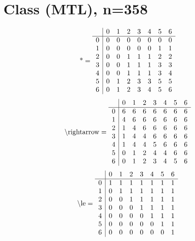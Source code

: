 \documentclass[11pt]{article}
\begin{document}
\section{Class (MTL), n=358}
\[\text{*} = 
\begin{array}{r | r r r r r r r}
 & 0 & 1 & 2 & 3 & 4 & 5 & 6 \\ \hline
0 & 0 & 0 & 0 & 0 & 0 & 0 & 0 \\
1 & 0 & 0 & 0 & 0 & 0 & 1 & 1 \\
2 & 0 & 0 & 1 & 1 & 1 & 2 & 2 \\
3 & 0 & 0 & 1 & 1 & 1 & 3 & 3 \\
4 & 0 & 0 & 1 & 1 & 1 & 3 & 4 \\
5 & 0 & 1 & 2 & 3 & 3 & 5 & 5 \\
6 & 0 & 1 & 2 & 3 & 4 & 5 & 6 \\
\end{array}
\]
\[\text{\textbackslash rightarrow} = 
\begin{array}{r | r r r r r r r}
 & 0 & 1 & 2 & 3 & 4 & 5 & 6 \\ \hline
0 & 6 & 6 & 6 & 6 & 6 & 6 & 6 \\
1 & 4 & 6 & 6 & 6 & 6 & 6 & 6 \\
2 & 1 & 4 & 6 & 6 & 6 & 6 & 6 \\
3 & 1 & 4 & 4 & 6 & 6 & 6 & 6 \\
4 & 1 & 4 & 4 & 5 & 6 & 6 & 6 \\
5 & 0 & 1 & 2 & 4 & 4 & 6 & 6 \\
6 & 0 & 1 & 2 & 3 & 4 & 5 & 6 \\
\end{array}
\]
\[\text{\textbackslash le} = 
\begin{array}{r | r r r r r r r}
 & 0 & 1 & 2 & 3 & 4 & 5 & 6 \\ \hline
0 & 1 & 1 & 1 & 1 & 1 & 1 & 1 \\
1 & 0 & 1 & 1 & 1 & 1 & 1 & 1 \\
2 & 0 & 0 & 1 & 1 & 1 & 1 & 1 \\
3 & 0 & 0 & 0 & 1 & 1 & 1 & 1 \\
4 & 0 & 0 & 0 & 0 & 1 & 1 & 1 \\
5 & 0 & 0 & 0 & 0 & 0 & 1 & 1 \\
6 & 0 & 0 & 0 & 0 & 0 & 0 & 1 \\
\end{array}
\]
\end{document}
